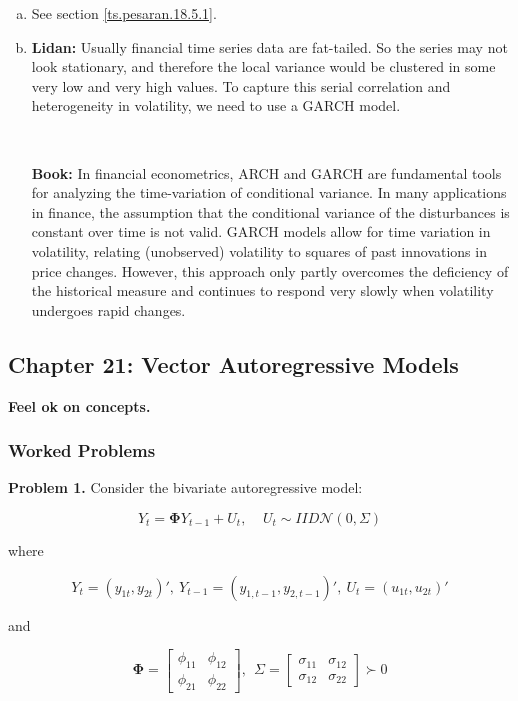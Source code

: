 \begin{enumerate}[(a)]
\item See section \ref{ts.pesaran.18.5.1}.

\item \textbf{Lidan:} Usually financial time series data are fat-tailed. So the series may not look stationary, and therefore the local variance would be clustered in some very low and very high values. To capture this serial correlation and heterogeneity in volatility, we need to use a GARCH model.

\

\textbf{Book:} In financial econometrics, ARCH and GARCH are fundamental tools for analyzing the time-variation of conditional variance. In many applications in finance, the assumption that the conditional variance of the disturbances is constant over time is not valid. GARCH models allow for time variation in volatility, relating (unobserved) volatility to squares of past innovations in price changes. However, this approach only partly overcomes the deficiency of the historical measure and continues to respond very slowly when volatility undergoes rapid changes.

\end{enumerate}

%
%
%
%
%
%

\subsection{Chapter 21: Vector Autoregressive Models}

\textbf{Feel ok on concepts.}

\subsubsection{Worked Problems} \label{ts.ch21.worked.problems}

\textbf{Problem 1.} Consider the bivariate autoregressive model:

\begin{equation}\label{ts.hw6.2.3}
Y_t = \boldsymbol{\Phi}Y_{t-1} + U_t, \ \ \ \ \ U_t \sim IID \mathcal{N}(0, \Sigma)
\end{equation}

where

\[
Y_t = (y_{1t}, y_{2t})', \ Y_{t-1} = (y_{1, t-1}, y_{2, t-1})', \ U_t = (u_{1t}, u_{2t})'
\]

and

\[
\boldsymbol{\Phi} = \begin{bmatrix}\phi_{11} & \phi_{12} \\ \phi_{21} & \phi_{22} \end{bmatrix}, \ \ \Sigma = \begin{bmatrix} \sigma_{11} & \sigma_{12} \\ \sigma_{12} & \sigma_{22} \end{bmatrix} \succ 0
\]


